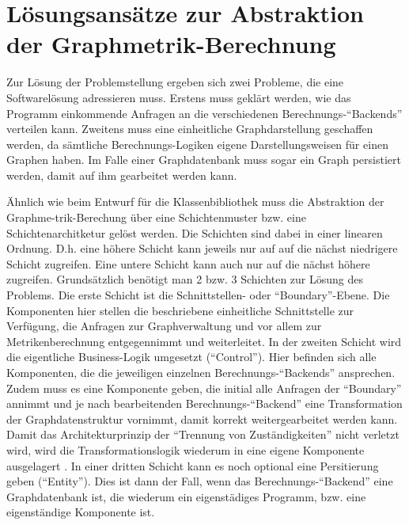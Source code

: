 \documentclass[a4paper,12pt,ngerman,chapterprefix=false,listof=totoc,bibliography=totoc]{scrreprt}
\begin{document}
{{\section{Lösungsansätze zur Abstraktion der Graphmetrik-Berechnung}
{
Zur Lösung der Problemstellung ergeben sich zwei Probleme, die eine Softwarelösung adressieren muss. Erstens muss geklärt werden, wie das Programm einkommende Anfragen an die verschiedenen Berechnungs-"`Backends"' verteilen kann. Zweitens muss eine einheitliche Graphdarstellung geschaffen werden, da sämtliche Berechnungs-Logiken eigene Darstellungsweisen für einen Graphen haben. Im Falle einer Graphdatenbank muss sogar ein Graph persistiert werden, damit auf ihm gearbeitet werden kann.

Ähnlich wie beim Entwurf für die Klassenbibliothek muss die Abstraktion der Graphme-trik-Berechung über eine Schichtenmuster bzw. eine Schichtenarchitketur gelöst werden. Die Schichten sind dabei in einer linearen Ordnung. D.h. eine höhere Schicht kann jeweils nur auf auf die nächst niedrigere Schicht zugreifen. Eine untere Schicht kann auch nur auf die nächst höhere zugreifen. \cite{balzert_lehrbuch_2011} Grundsätzlich benötigt man 2 bzw. 3 Schichten zur Lösung des Problems. Die erste Schicht ist die Schnittstellen- oder "`Boundary"'-Ebene. Die Komponenten hier stellen die beschriebene einheitliche Schnittstelle zur Verfügung, die Anfragen zur Graphverwaltung und vor allem zur Metrikenberechnung entgegennimmt und weiterleitet. In der zweiten Schicht wird die eigentliche Business-Logik umgesetzt ("`Control"'). Hier befinden sich alle Komponenten, die die jeweiligen einzelnen Berechnungs-"`Backends"' ansprechen. Zudem muss es eine Komponente geben, die initial alle Anfragen der "`Boundary"' annimmt und je nach bearbeitenden Berechnungs-"`Backend"' eine Transformation der Graphdatenstruktur vornimmt, damit korrekt weitergearbeitet werden kann. Damit das Architekturprinzip der "`Trennung von Zuständigkeiten"' nicht verletzt wird, wird die Transformationslogik wiederum in eine eigene Komponente ausgelagert \cite{balzert_lehrbuch_2011}. In einer dritten Schicht kann es noch optional eine Persitierung geben ("`Entity"'). Dies ist dann der Fall, wenn das Berechnungs-"`Backend"' eine Graphdatenbank ist, die wiederum ein eigenstädiges Programm, bzw. eine eigenständige Komponente ist.

}}}
\end{document}
